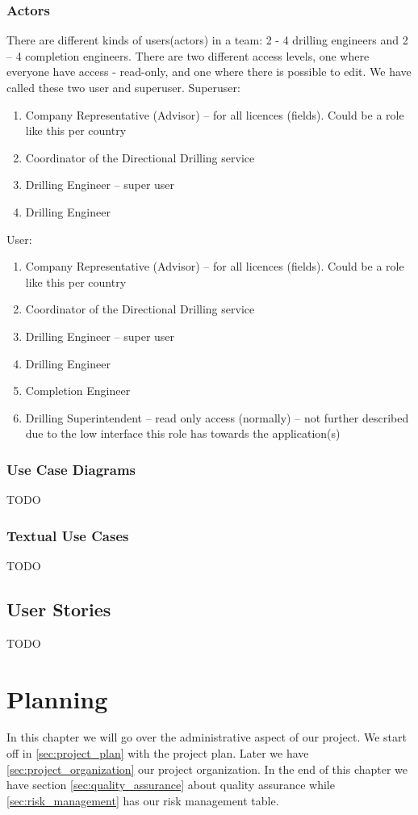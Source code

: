 \documentclass{report}
\begin{document}
\subsection{Actors} \label{subsec:actors}
There are different kinds of users(actors) in a team: 2 - 4 drilling engineers and 2 – 4 completion engineers. There are two different access levels, one where everyone have access - read-only, and one where there is possible to edit. We have called these two user and superuser.
Superuser:
\begin{enumerate}
    \item Company Representative (Advisor) – for all licences (fields). Could be a role like this per country
    \item Coordinator of the Directional Drilling service
    \item Drilling Engineer – super user
    \item Drilling Engineer
\end{enumerate}
User:
\begin{enumerate}
    \item Company Representative (Advisor) – for all licences (fields). Could be a role like this per country
    \item Coordinator of the Directional Drilling service
    \item Drilling Engineer – super user
    \item Drilling Engineer
    \item Completion Engineer
    \item Drilling Superintendent – read only access (normally) – not further described due to the low interface this role has towards the application(s)
\end{enumerate}

\subsection{Use Case Diagrams} \label{subsec:use_case_diagrams}
TODO
\subsection{Textual Use Cases} \label{subsec:textual_use_cases}
TODO
\section{User Stories} \label{sec:user_stories}
TODO



\chapter{Planning} \label{cha:planning}
In this chapter we will go over the administrative aspect of our project. We start off in \ref{sec:project_plan} with the project plan. Later we have \ref{sec:project_organization} our project organization. In the end of this chapter we have section \ref{sec:quality_assurance} about quality assurance while \ref{sec:risk_management} has our risk management table.
\end{document}
